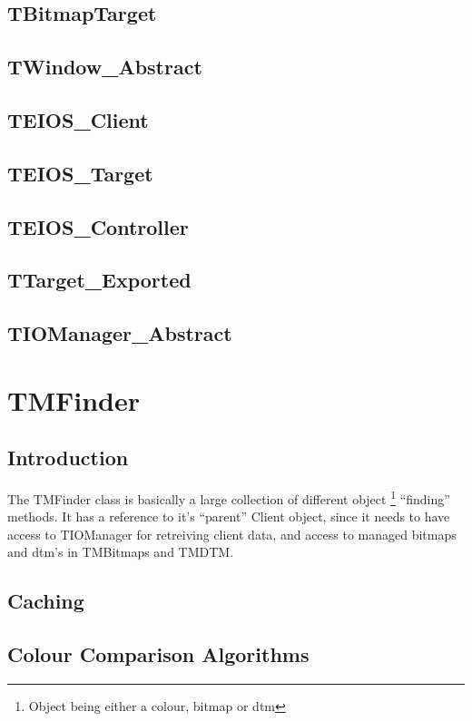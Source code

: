 \documentclass[a4paper, 10pt]{report} %
\begin{document}
\subsection{TBitmapTarget}
\subsection{TWindow\_Abstract}
\subsection{TEIOS\_Client}
\subsection{TEIOS\_Target}
\subsection{TEIOS\_Controller}
\subsection{TTarget\_Exported}
\subsection{TIOManager\_Abstract}

\section{TMFinder}

\subsection{Introduction}

The TMFinder class is basically a large collection of different object
\footnote{Object being either a colour, bitmap or dtm} ``finding'' methods.
It has a reference to it's ``parent'' Client object, since it needs to have
access to TIOManager for retreiving client data, and access to managed bitmaps
and dtm's in TMBitmaps and TMDTM.


\subsection{Caching}

\subsection{Colour Comparison Algorithms}
\end{document}
